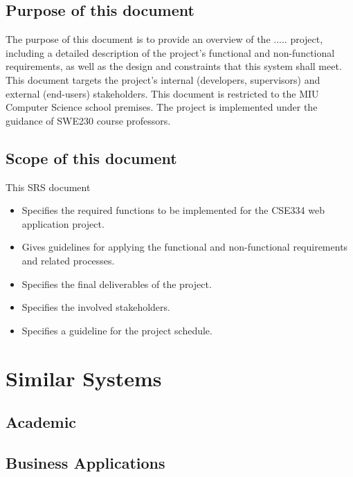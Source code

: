 \documentclass[12pt]{article}
\begin{document}
\subsection{Purpose of this document}
The purpose of this document is to provide an overview of the ..... project, including a detailed description of the project's functional and non-functional requirements, as well as the design and constraints that this system shall meet. This document targets the project's internal (developers, supervisors) and external (end-users) stakeholders. This document is restricted to the MIU Computer Science school premises. The project is implemented under the guidance of SWE230 course professors. 

\subsection{Scope of this document}
This SRS document
\begin{itemize}
    \item Specifies the required functions to be implemented for the CSE334 web application project. 
    \item Gives guidelines for applying the functional and non-functional requirements and related processes.
    \item Specifies the final deliverables of the project.
    \item Specifies the involved stakeholders. 
    \item Specifies a guideline for the project schedule.
\end{itemize}




\section{Similar Systems}
\subsection{Academic}

\subsection{Business Applications}
\end{document}
